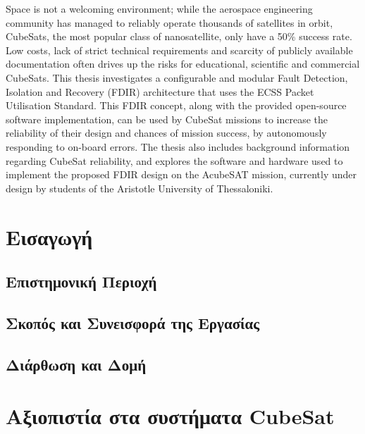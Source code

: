 \documentclass[a4paper,nobib]{tufte-book}
\begin{document}
\justify
Space is not a welcoming environment; while the aerospace engineering community has managed to reliably operate thousands of satellites in orbit, CubeSats, the most popular class of nanosatellite, only have a 50\% success rate. Low costs, lack of strict technical requirements and scarcity of publicly available documentation often drives up the risks for educational, scientific and commercial CubeSats. This thesis investigates a configurable and modular Fault Detection, Isolation and Recovery (FDIR) architecture that uses the ECSS Packet Utilisation Standard. This FDIR concept, along with the provided open-source software implementation, can be used by CubeSat missions to increase the reliability of their design and chances of mission success, by autonomously responding to on-board errors. The thesis also includes background information regarding CubeSat reliability, and explores the software and hardware used to implement the proposed FDIR design on the AcubeSAT mission, currently under design by students of the Aristotle University of Thessaloniki.


\mainmatter


\chapter{Εισαγωγή}

\section{Επιστημονική Περιοχή}

\section{Σκοπός και Συνεισφορά της Εργασίας}

\section{Διάρθωση και Δομή}

\chapter{Αξιοπιστία στα συστήματα CubeSat}
\label{sec:fdir}


\end{document}
